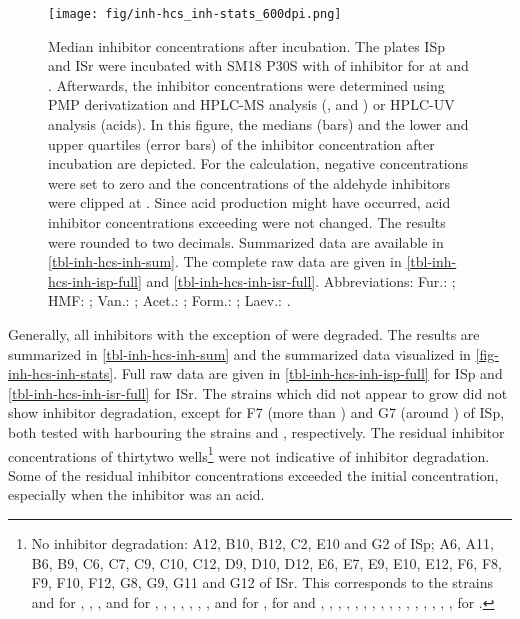 \begin{figure}
	\begin{center}
		\texttt{[image: fig/inh-hcs\_inh-stats\_600dpi.png]}
		\caption[Median Inhibitor Concentrations After  Incubation]{Median inhibitor concentrations after  incubation. The plates ISp and ISr were incubated with  SM18 P30S with  of inhibitor for  at  and . Afterwards, the inhibitor concentrations were determined using PMP derivatization and HPLC-MS analysis (\fur{}, \hmf{} and \van{}) or HPLC-UV analysis (acids). In this figure, the medians (bars) and the lower and upper quartiles (error bars) of the inhibitor concentration after incubation are depicted. For the calculation, negative concentrations were set to zero and the concentrations of the aldehyde inhibitors were clipped at . Since acid production might have occurred, acid inhibitor concentrations exceeding  were not changed. The results were rounded to two decimals. Summarized data are available in \vref{tbl-inh-hcs-inh-sum}. The complete raw data are given in \vref{tbl-inh-hcs-inh-isp-full} and \vref{tbl-inh-hcs-inh-isr-full}. Abbreviations: Fur.: \fur{}; HMF: \hmf{}; Van.: \van{}; Acet.: \acet{}; Form.: \fora{}; Laev.: \laev{}.\label{fig-inh-hcs-inh-stats}}
	\end{center}
\end{figure}
Generally, all inhibitors with the exception of \laev{} were degraded. The results are summarized in \vref{tbl-inh-hcs-inh-sum} and the summarized data visualized in \vref{fig-inh-hcs-inh-stats}. Full raw data are given in \vref{tbl-inh-hcs-inh-isp-full} for ISp and \vref{tbl-inh-hcs-inh-isr-full} for ISr. The strains which did not appear to grow did not show inhibitor degradation, except for F7 (more than ) and G7 (around ) of ISp, both tested with \fur{} harbouring the strains  and , respectively. The residual inhibitor concentrations of thirtytwo wells\footnote{No inhibitor degradation: A12, B10, B12, C2, E10 and G2 of ISp; A6, A11, B6, B9, C6, C7, C9, C10, C12, D9, D10, D12, E6, E7, E9, E10, E12, F6, F8, F9, F10, F12, G8, G9, G11 and G12 of ISr. This corresponds to the strains  and  for \hmf{}, , ,  and  for \van{}, , , , , , ,  and  for \acet{},  for \fora{} and , , , , , , , , , , , , , , , ,  for \laev{}.} were not indicative of inhibitor degradation. Some of the residual inhibitor concentrations exceeded the initial concentration, especially when the inhibitor was an acid.

